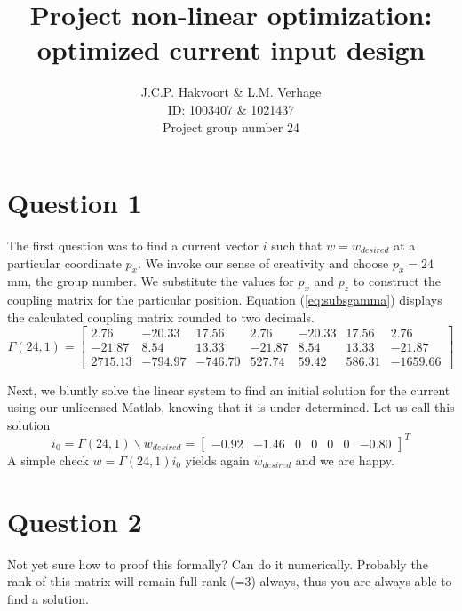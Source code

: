 \documentclass[a4paper,10pt]{article}
\begin{document}
\pagestyle{fancy}

\title{Project non-linear optimization: optimized current input design
}
\author{J.C.P. Hakvoort \& L.M. Verhage\\
        ID: 1003407 \& 1021437 \\
        Project group number 24} 


\maketitle
\thispagestyle{empty}

\section{Question 1} \label{sec:question1}
The first question was to find a current vector $i$ such that $w=w_{desired}$ at a particular coordinate $p_x$. We invoke our sense of creativity and choose $p_x=24$ mm, the group number. We substitute the values for $p_x$ and $p_z$ to construct the coupling matrix for the particular position. Equation (\ref{eq:subsgamma}) displays the calculated coupling matrix rounded to two decimals.
\begin{equation} \label{eq:subsgamma}
    \Gamma(24,1)=
\begin{bmatrix}
2.76    & -20.33    & 17.56     & 2.76      & -20.33    & 17.56     & 2.76 \\
-21.87  & 8.54      & 13.33     & -21.87    & 8.54      & 13.33     & -21.87 \\
2715.13 & -794.97   & -746.70   & 527.74    &	59.42   & 586.31    & -1659.66 
\end{bmatrix}
\end{equation}

Next, we bluntly solve the linear system to find an initial solution for the current using our unlicensed Matlab, knowing that it is under-determined. Let us call this solution 
\begin{equation} \label{eq:i_0}
i_0 = \Gamma(24,1)\backslash w_{desired} = \begin{bmatrix} -0.92& -1.46& 0& 0& 0& 0& -0.80 \end{bmatrix} ^T 
\end{equation}
A simple check $w=\Gamma(24,1)i_0$ yields again $w_{desired}$ and we are happy.

\section{Question 2} \label{sec:question2}
Not yet sure how to proof this formally? Can do it numerically. Probably the rank of this matrix will remain full rank (=3) always, thus you are always able to find a solution.
\end{document}
